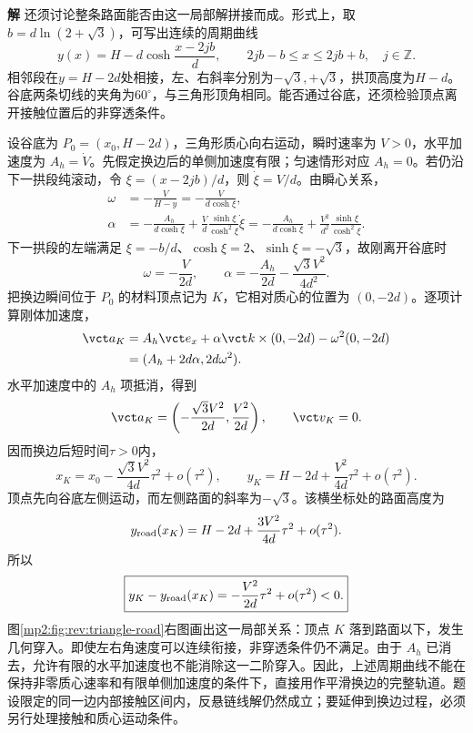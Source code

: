 \documentclass[11pt,openany,fontset=fandol]{ctexbook}
\theoremstyle{definition}\newtheorem{example}{例}[chapter]\newtheorem{exercise}{习题}[chapter]
\newcommand{\SolutionStart}{\par\medskip\ifdim\pagetotal>0pt\ifdim\dimexpr\pagegoal-\pagetotal\relax<3\baselineskip\newpage\fi\fi\noindent\textbf{解}\quad\ignorespaces}
\newenvironment{solution}{\SolutionStart}{\par\medskip}
\begin{document}
\begin{solution}
还须讨论整条路面能否由这一局部解拼接而成。形式上，取$b=d\ln(2+\sqrt3)$，可写出连续的周期曲线
\[
 y(x)=H-d\cosh\frac{x-2jb}{d},\qquad
 2jb-b\le x\le2jb+b,\quad j\in\mathbb Z.
\]
相邻段在$y=H-2d$处相接，左、右斜率分别为$-\sqrt3,+\sqrt3$，拱顶高度为$H-d$。谷底两条切线的夹角为$60^\circ$，与三角形顶角相同。能否通过谷底，还须检验顶点离开接触位置后的非穿透条件。

设谷底为 $P_0=(x_0,H-2d)$，三角形质心向右运动，瞬时速率为 $V>0$，水平加速度为 $A_h=\dot V$。先假定换边后的单侧加速度有限；匀速情形对应 $A_h=0$。若仍沿下一拱段纯滚动，令 $\xi=(x-2jb)/d$，则 $\dot\xi=V/d$。由瞬心关系，
\[
\begin{aligned}
\omega&=-\frac{V}{H-y}=-\frac{V}{d\cosh\xi},\\
\alpha&=-\frac{A_h}{d\cosh\xi}
+\frac Vd\frac{\sinh\xi}{\cosh^2\xi}\dot\xi
=-\frac{A_h}{d\cosh\xi}
+\frac{V^2}{d^2}\frac{\sinh\xi}{\cosh^2\xi}.
\end{aligned}
\]
下一拱段的左端满足 $\xi=-b/d$、$\cosh\xi=2$、$\sinh\xi=-\sqrt3$，故刚离开谷底时
\[
\omega=-\frac V{2d},\qquad
\alpha=-\frac{A_h}{2d}-\frac{\sqrt3V^2}{4d^2}.
\]
把换边瞬间位于 $P_0$ 的材料顶点记为 $K$，它相对质心的位置为 $(0,-2d)$。逐项计算刚体加速度，
\[
\begin{aligned}
\vct a_K&=A_h\vct e_x+\alpha\vct k\times(0,-2d)-\omega^2(0,-2d)\\
&=(A_h+2d\alpha,2d\omega^2).
\end{aligned}
\]
水平加速度中的 $A_h$ 项抵消，得到
\[
 \vct a_K=\left(-\frac{\sqrt3V^2}{2d},\frac{V^2}{2d}\right),
 \qquad \vct v_K=0.
\]
因而换边后短时间$\tau>0$内，
\[
 x_K=x_0-\frac{\sqrt3V^2}{4d}\tau^2+o(\tau^2),\qquad
 y_K=H-2d+\frac{V^2}{4d}\tau^2+o(\tau^2).
\]
顶点先向谷底左侧运动，而左侧路面的斜率为$-\sqrt3$。该横坐标处的路面高度为
\[
 y_{\rm road}(x_K)=H-2d+\frac{3V^2}{4d}\tau^2+o(\tau^2).
\]
所以
\[
 \boxed{y_K-y_{\rm road}(x_K)
 =-\frac{V^2}{2d}\tau^2+o(\tau^2)<0.}
\]
图\ref{mp2:fig:rev:triangle-road}右图画出这一局部关系：顶点 $K$ 落到路面以下，发生几何穿入。即使左右角速度可以连续衔接，非穿透条件仍不满足。由于 $A_h$ 已消去，允许有限的水平加速度也不能消除这一二阶穿入。因此，上述周期曲线不能在保持非零质心速率和有限单侧加速度的条件下，直接用作平滑换边的完整轨道。题设限定的同一边内部接触区间内，反悬链线解仍然成立；要延伸到换边过程，必须另行处理接触和质心运动条件。


\end{solution}
\end{document}
